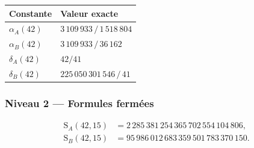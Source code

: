 \documentclass[11pt,a4paper]{article}
\newcommand{\SA}{\mathrm{S}_A}
\newcommand{\SB}{\mathrm{S}_B}
\begin{document}
\begin{center}\small
\begin{tabular}{@{}l l@{}}
\toprule
\rowcolor{spectralgris}
Constante & Valeur exacte \\
\midrule
$\alpha_A(42)$ & $3\,109\,933\,/\,1\,518\,804$ \\
$\alpha_B(42)$ & $3\,109\,933\,/\,36\,162$ \\
$\delta_A(42)$ & $42/41$ \\
$\delta_B(42)$ & $225\,050\,301\,546\,/\,41$ \\
\bottomrule
\end{tabular}
\end{center}

\subsubsection{Niveau 2 --- Formules fermées}
\begin{align*}
\SA(42,15)&=2\,285\,381\,254\,365\,702\,554\,104\,806,\\
\SB(42,15)&=95\,986\,012\,683\,359\,501\,783\,370\,150.
\end{align*}
\end{document}
